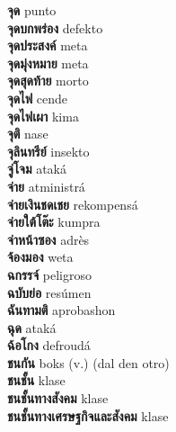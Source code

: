 \textbf{ จุด  } punto \\
\textbf{ จุดบกพร่อง  } defekto \\
\textbf{ จุดประสงค์  } meta \\
\textbf{ จุดมุ่งหมาย  } meta \\
\textbf{ จุดสุดท้าย  } morto \\
\textbf{ จุดไฟ  } cende \\
\textbf{ จุดไฟเผา  } kima \\
\textbf{ จุติ  } nase \\
\textbf{ จุลินทรีย์  } insekto \\
\textbf{ จู่โจม  } ataká \\
\textbf{ จ่าย  } atministrá \\
\textbf{ จ่ายเงินชดเชย  } rekompensá \\
\textbf{ จ่ายใต้โต๊ะ  } kumpra \\
\textbf{ จ่าหน้าซอง  } adrès \\
\textbf{ จ้องมอง  } weta \\
\textbf{ ฉกรรจ์  } peligroso \\
\textbf{ ฉบับย่อ  } resúmen \\
\textbf{ ฉันทามติ  } aprobashon \\
\textbf{ ฉุด  } ataká \\
\textbf{ ฉ้อโกง  } defroudá \\
\textbf{ ชนกัน  } boks (v.) (dal den otro) \\
\textbf{ ชนชั้น  } klase \\
\textbf{ ชนชั้นทางสังคม  } klase \\
\textbf{ ชนชั้นทางเศรษฐกิจและสังคม  } klase \\
